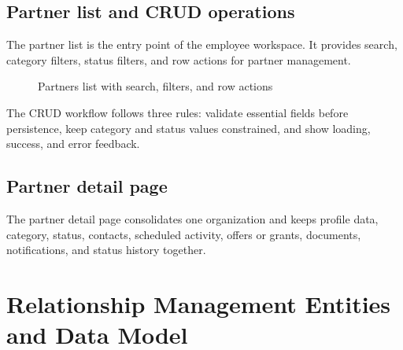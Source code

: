 \subsection{Partner list and CRUD operations}
The partner list is the entry point of the employee workspace. It provides search, category filters, status filters, and row actions for partner management.

\begin{figure}[htbp]
  \centering
  \caption{Partners list with search, filters, and row actions}
\end{figure}

The CRUD workflow follows three rules: validate essential fields before persistence, keep category and status values constrained, and show loading, success, and error feedback.

\subsection{Partner detail page}
The partner detail page consolidates one organization and keeps profile data, category, status, contacts, scheduled activity, offers or grants, documents, notifications, and status history together.

\section{Relationship Management Entities and Data Model}

